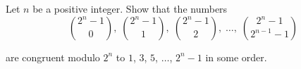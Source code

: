 Let $ n$ be a positive integer. Show that the numbers\[ \binom{2^n - 1}{0},\; \binom{2^n - 1}{1},\; \binom{2^n - 1}{2},\; \ldots,\; \binom{2^n - 1}{2^{n - 1} - 1}\]

are congruent modulo $ 2^n$ to $ 1$,  $ 3$,  $ 5$,  $ \ldots$,  $ 2^n - 1$ in some order.